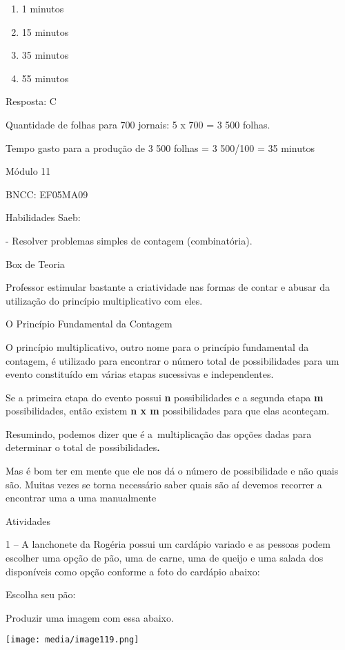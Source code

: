 \begin{enumerate}
\def\labelenumi{\alph{enumi})}
\item
  1 minutos
\item
  15 minutos
\item
  35 minutos
\item
  55 minutos
\end{enumerate}

Resposta: C

Quantidade de folhas para 700 jornais: 5 x 700 = 3 500 folhas.

Tempo gasto para a produção de 3 500 folhas = 3 500/100 = 35 minutos

Módulo 11

BNCC: EF05MA09

Habilidades Saeb:

- Resolver problemas simples de contagem (combinatória).

Box de Teoria

Professor estimular bastante a criatividade nas formas de contar e
abusar da utilização do princípio multiplicativo com eles.

O Princípio Fundamental da Contagem

O princípio multiplicativo, outro nome para o princípio fundamental da
contagem, é utilizado para encontrar o número total de possibilidades
para um evento constituído em várias etapas sucessivas e independentes.

Se a primeira etapa do evento possui \textbf{n} possibilidades e a
segunda etapa \textbf{m} possibilidades, então existem \textbf{n x m}
possibilidades para que elas aconteçam.

Resumindo, podemos dizer que é a~multiplicação das opções dadas para
determinar o total de possibilidades\textbf{.}

Mas é bom ter em mente que ele nos dá o número de possibilidade e não
quais são. Muitas vezes se torna necessário saber quais são aí devemos
recorrer a encontrar uma a uma manualmente

Atividades

1 -- A lanchonete da Rogéria possui um cardápio variado e as pessoas
podem escolher uma opção de pão, uma de carne, uma de queijo e uma
salada dos disponíveis como opção conforme a foto do cardápio abaixo:

Escolha seu pão:

Produzir uma imagem com essa abaixo.

\texttt{[image: media/image119.png]}

